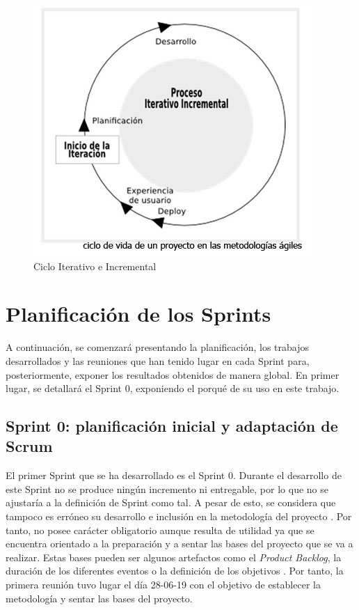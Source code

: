 \begin{figure}[h]
  \centering
  \includegraphics[width=0.52\linewidth]{figures/images/ciclo_iterativo_incremental.jpg}
  \caption{Ciclo Iterativo e Incremental}
  \label{fig:iteraincr}
\end{figure}

\clearpage

\section{Planificación de los Sprints}
A continuación, se comenzará presentando la planificación, los trabajos desarrollados y las reuniones que han tenido lugar en cada Sprint para, posteriormente, exponer los resultados obtenidos de manera global. En primer lugar, se detallará el Sprint 0, exponiendo el porqué de su uso en este trabajo.

\subsection{Sprint 0: planificación inicial y adaptación de Scrum}
El primer Sprint que se ha desarrollado es el Sprint 0. Durante el desarrollo de este Sprint no se produce ningún incremento ni entregable, por lo que no se ajustaría a la definición de Sprint como tal. A pesar de esto, se considera que tampoco es erróneo su desarrollo e inclusión en la metodología del proyecto \cite{alexballarinlatre2017}. Por tanto, no posee carácter obligatorio aunque resulta de utilidad ya que se encuentra orientado a la preparación y a sentar las bases del proyecto que se va a realizar. Estas bases pueden ser algunos artefactos como el \textit{Product Backlog}, la duración de los diferentes eventos o la definición de los objetivos \cite{agripinopetit2017}. Por tanto, la primera reunión tuvo lugar el día 28-06-19 con el objetivo de establecer la metodología y sentar las bases del proyecto.

